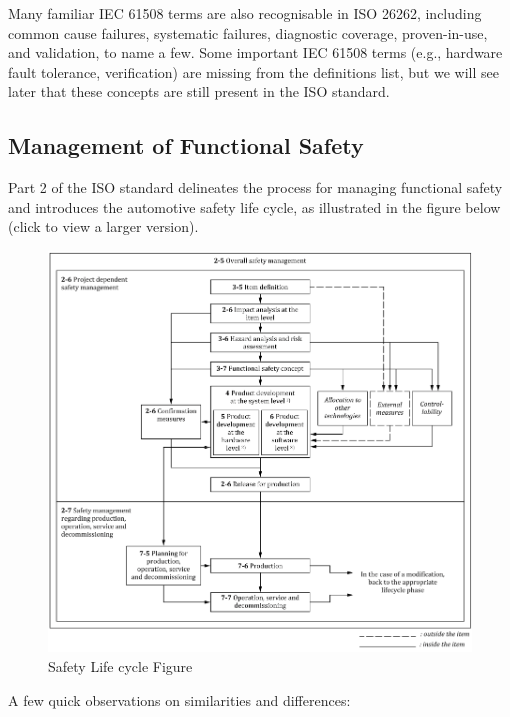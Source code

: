 \documentclass[./dissertation.tex]{subfiles}
\begin{document}
Many familiar IEC 61508 terms are also recognisable in ISO 26262, including common cause failures, systematic failures, diagnostic coverage, proven-in-use, and validation, to name a few. Some important IEC 61508 terms (e.g., hardware fault tolerance, verification) are missing from the definitions list, but we will see later that these concepts are still present in the ISO standard.


\subsection{Management of Functional Safety}
Part 2 of the ISO standard delineates the process for managing functional safety and introduces the automotive safety life cycle, as illustrated in the figure below (click to view a larger version).

\begin{figure}[h]
\centering
\includegraphics[scale=0.5]{subfiles/imgs/SafetyLifecycleFigure.png}
\caption{Safety Life cycle Figure}
\label{fig:safety_lifecycle}
\end{figure}


A few quick observations on similarities and differences:
\end{document}
